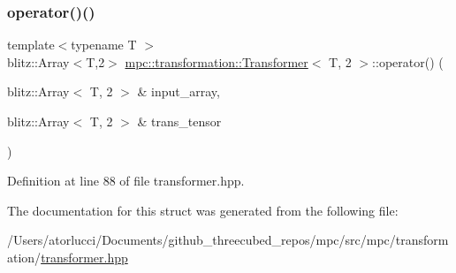 \subsubsection{\texorpdfstring{operator()()}{operator()()}}
{\footnotesize\ttfamily template$<$typename T $>$ \\
blitz\+::\+Array$<$T,2$>$ \mbox{\hyperlink{structmpc_1_1transformation_1_1_transformer}{mpc\+::transformation\+::\+Transformer}}$<$ T, 2 $>$\+::operator() (\begin{DoxyParamCaption}\item[{blitz\+::\+Array$<$ T, 2 $>$ \&}]{input\+\_\+array,  }\item[{blitz\+::\+Array$<$ T, 2 $>$ \&}]{trans\+\_\+tensor }\end{DoxyParamCaption})\hspace{0.3cm}{\ttfamily [inline]}}



Definition at line 88 of file transformer.\+hpp.



The documentation for this struct was generated from the following file\+:\begin{DoxyCompactItemize}
\item 
/\+Users/atorlucci/\+Documents/github\+\_\+threecubed\+\_\+repos/mpc/src/mpc/transformation/\mbox{\hyperlink{transformer_8hpp}{transformer.\+hpp}}\end{DoxyCompactItemize}
